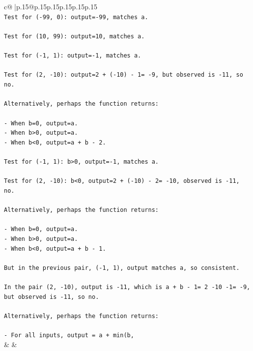 \documentclass{article}
\begin{document}
{\begin{supertabular}{c@{$\;$}|p{.15\linewidth}@{}p{.15\linewidth}p{.15\linewidth}p{.15\linewidth}p{.15\linewidth}p{.15\linewidth}}
{{{\\ 
\texttt{Test for ({-}99, 0): output={-}99, matches a.} \\
\\ 
\texttt{Test for (10, 99): output=10, matches a.} \\
\\ 
\texttt{Test for ({-}1, 1): output={-}1, matches a.} \\
\\ 
\texttt{Test for (2, {-}10): output=2 + ({-}10) {-} 1= {-}9, but observed is {-}11, so no.} \\
\\ 
\texttt{Alternatively, perhaps the function returns:} \\
\\ 
\texttt{{-} When b=0, output=a.} \\
\texttt{{-} When b>0, output=a.} \\
\texttt{{-} When b<0, output=a + b {-} 2.} \\
\\ 
\texttt{Test for ({-}1, 1): b>0, output={-}1, matches a.} \\
\\ 
\texttt{Test for (2, {-}10): b<0, output=2 + ({-}10) {-} 2= {-}10, observed is {-}11, no.} \\
\\ 
\texttt{Alternatively, perhaps the function returns:} \\
\\ 
\texttt{{-} When b=0, output=a.} \\
\texttt{{-} When b>0, output=a.} \\
\texttt{{-} When b<0, output=a + b {-} 1.} \\
\\ 
\texttt{But in the previous pair, ({-}1, 1), output matches a, so consistent.} \\
\\ 
\texttt{In the pair (2, {-}10), output is {-}11, which is a + b {-} 1= 2 {-}10 {-}1= {-}9, but observed is {-}11, so no.} \\
\\ 
\texttt{Alternatively, perhaps the function returns:} \\
\\ 
\texttt{{-} For all inputs, output = a + min(b,} \\
            }
        }
    }
    & & \\ \\


\end{supertabular}}
\end{document}
